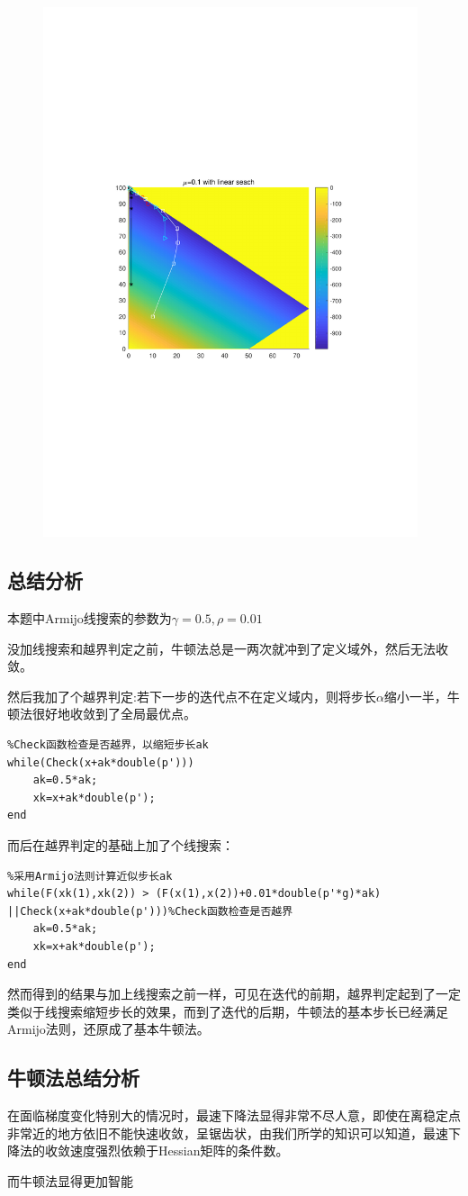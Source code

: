 \begin{figure}[H]
\centering
\includegraphics[width=11cm]{fig/3_2.pdf}
\end{figure}

\subsection{总结分析}
本题中Armijo线搜索的参数为$\gamma=0.5,\rho=0.01$

没加线搜索和越界判定之前，牛顿法总是一两次就冲到了定义域外，然后无法收敛。

然后我加了个越界判定:若下一步的迭代点不在定义域内，则将步长$\alpha$缩小一半，牛顿法很好地收敛到了全局最优点。

\begin{lstlisting}
%Check函数检查是否越界，以缩短步长ak
while(Check(x+ak*double(p')))
	ak=0.5*ak;
	xk=x+ak*double(p');
end
\end{lstlisting}

而后在越界判定的基础上加了个线搜索：

\begin{lstlisting}
%采用Armijo法则计算近似步长ak
while(F(xk(1),xk(2)) > (F(x(1),x(2))+0.01*double(p'*g)*ak)
||Check(x+ak*double(p')))%Check函数检查是否越界
	ak=0.5*ak;
	xk=x+ak*double(p');
end
\end{lstlisting}

然而得到的结果与加上线搜索之前一样，可见在迭代的前期，越界判定起到了一定类似于线搜索缩短步长的效果，而到了迭代的后期，牛顿法的基本步长已经满足Armijo法则，还原成了基本牛顿法。

\subsection{牛顿法总结分析}
在面临梯度变化特别大的情况时，最速下降法显得非常不尽人意，即使在离稳定点非常近的地方依旧不能快速收敛，呈锯齿状，由我们所学的知识可以知道，最速下降法的收敛速度强烈依赖于Hessian矩阵的条件数。

而牛顿法显得更加智能
